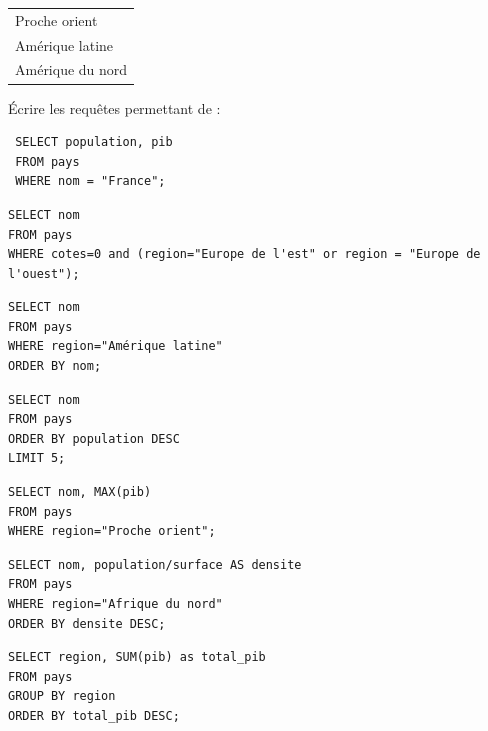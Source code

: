 \documentclass[11pt,a4paper]{article}
\begin{document}
\begin{Exercise}[title={Requêtes \textsc{sql} sur une seule table}]
\begin{center}
\begin{tabular}{|l|}
		Proche orient\\
		Amérique latine\\
		Amérique du nord\\
		\hline
	\end{tabular}
\end{center}
Écrire les requêtes permettant de :
\ifcorrige
\begin{verbatim}
 SELECT population, pib 
 FROM pays 
 WHERE nom = "France";
\end{verbatim}
\fi
{}
\ifcorrige
\begin{verbatim}
SELECT nom 
FROM pays 
WHERE cotes=0 and (region="Europe de l'est" or region = "Europe de l'ouest");
\end{verbatim}
\fi
{}
\ifcorrige
\begin{verbatim}
SELECT nom 
FROM pays 
WHERE region="Amérique latine" 
ORDER BY nom;
\end{verbatim}
\fi
{}
\ifcorrige
\begin{verbatim}
SELECT nom
FROM pays
ORDER BY population DESC
LIMIT 5;
\end{verbatim}
\fi
{}
\ifcorrige
\begin{verbatim}
SELECT nom, MAX(pib)
FROM pays
WHERE region="Proche orient";
\end{verbatim}
\fi
{}
\ifcorrige
\begin{verbatim}
SELECT nom, population/surface AS densite
FROM pays 
WHERE region="Afrique du nord" 
ORDER BY densite DESC;
\end{verbatim}
\fi
{}
\ifcorrige
\begin{verbatim}
SELECT region, SUM(pib) as total_pib 
FROM pays 
GROUP BY region 
ORDER BY total_pib DESC;
\end{verbatim}
\fi

\end{Exercise}
\end{document}

